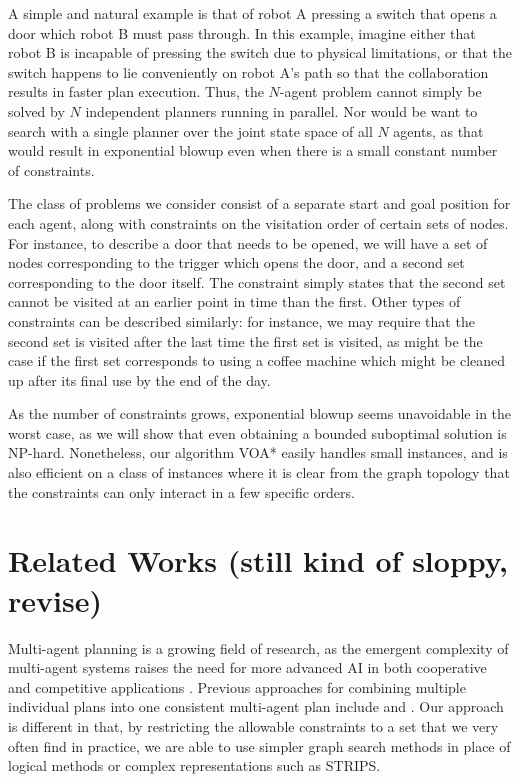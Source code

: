 \documentclass[letterpaper]{article}
\begin{document}
A simple and natural example is that of robot A pressing a switch that opens a door which robot B must pass through. In this example, imagine either that robot B is incapable of pressing the switch due to physical limitations, or that the switch happens to lie conveniently on robot A's path so that the collaboration results in faster plan execution. Thus, the $N$-agent problem cannot simply be solved by $N$ independent planners running in parallel. Nor would be want to search with a single planner over the joint state space of all $N$ agents, as that would result in exponential blowup even when there is a small constant number of constraints.

The class of problems we consider consist of a separate start and goal position for each agent, along with constraints on the visitation order of certain sets of nodes. For instance, to describe a door that needs to be opened, we will have a set of nodes corresponding to the trigger which opens the door, and a second set corresponding to the door itself. The constraint simply states that the second set cannot be visited at an earlier point in time than the first. Other types of constraints can be described similarly: for instance, we may require that the second set is visited after the last time the first set is visited, as might be the case if the first set corresponds to using a coffee machine which might be cleaned up after its final use by the end of the day.

As the number of constraints grows, exponential blowup seems unavoidable in the worst case, as we will show that even obtaining a bounded suboptimal solution is NP-hard. Nonetheless, our algorithm VOA* easily handles small instances, and is also efficient on a class of instances where it is clear from the graph topology that the constraints can only interact in a few specific orders.

\section{Related Works (still kind of sloppy, revise)}

Multi-agent planning is a growing field of research, as the emergent complexity of multi-agent systems raises the need for more advanced AI in both cooperative and competitive applications \cite{van2008multi}. Previous approaches for combining multiple individual plans into one consistent multi-agent plan include \cite{georgeff1988communication} and \cite{de2005multi}. Our approach is different in that, by restricting the allowable constraints to a set that we very often find in practice, we are able to use simpler graph search methods in place of logical methods or complex representations such as STRIPS.
\end{document}
